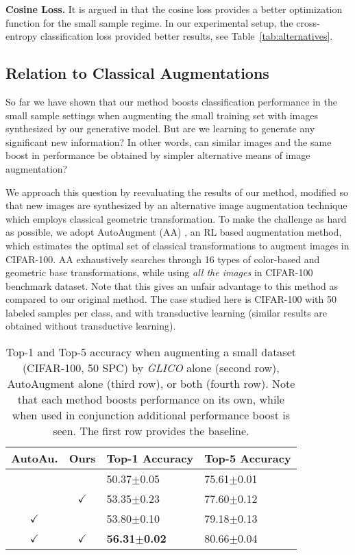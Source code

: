 \documentclass[a4paper,conference]{IEEEtran}
\begin{document}
\textbf{Cosine Loss.} It is argued in \cite{cosinesmalldata} that the cosine loss provides a better optimization function for the small sample regime. In our experimental setup, the cross-entropy classification loss provided better results, see Table~\ref{tab:alternatives}.


\subsection{Relation to Classical Augmentations}
\label{sec: autoaug}
So far we have shown that our method boosts classification performance in the small sample settings when augmenting the small training set with images synthesized by our generative model. But are we learning to generate any significant new information? In other words, can similar images and the same boost in performance be obtained by simpler alternative means of image augmentation? 

We approach this question by reevaluating the results of our method, modified so that new images are synthesized by an alternative image augmentation technique which employs classical geometric transformation. To make the challenge as hard as possible, we adopt AutoAugment (AA) \cite{Cubuk2018AutoAugmentLA}, an RL based augmentation method, which estimates the optimal set of classical transformations to augment images in CIFAR-100. AA exhaustively searches through 16 types of color-based and geometric base transformations, while using \emph{all the images} in CIFAR-100 benchmark dataset. Note that this gives an unfair advantage to this method as compared to our original method. The case studied here is CIFAR-100 with 50 labeled samples per class, and with transductive learning (similar results are obtained without transductive learning).

\begin{table}[htbp]
	\vskip -0.1in
	\centering
	\caption{Top-1 and Top-5 accuracy when augmenting a small dataset (CIFAR-100, 50 SPC) by \textit{GLICO} alone (second row), AutoAugment alone (third row), or both (fourth row). Note that each method boosts performance on its own, while when used in conjunction additional performance boost is seen. The first row provides the baseline.
	}
	\label{tab: autoaugment}
	\begin{tabular}{ccll}
		\toprule
		AutoAu.      & Ours         & Top-1 Accuracy          & Top-5 Accuracy \\
		\midrule
		             &              & 50.37$\pm$0.05          & 75.61$\pm$0.01 \\
		             & $\checkmark$ & 53.35$\pm$0.23          & 77.60$\pm$0.12 \\
		$\checkmark$ &              & 53.80$\pm$0.10          & 79.18$\pm$0.13 \\
		$\checkmark$ & $\checkmark$ & \textbf{56.31$\pm$0.02} & 80.66$\pm$0.04 \\
		\bottomrule
	\end{tabular}
	\vskip -0.1in
\end{table}
		
\end{document}
